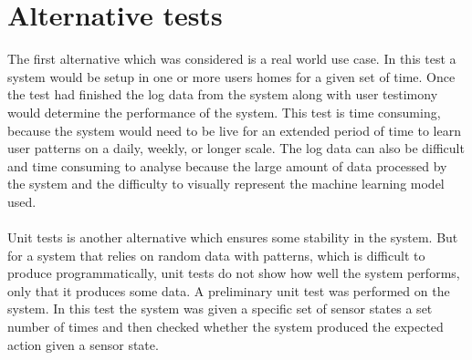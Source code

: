 \section{Alternative tests}
The first alternative which was considered is a real world use case. In this test a system would be setup in one or more users homes for a given set of time. Once the test had finished the log data from the system along with user testimony would determine the performance of the system. This test is time consuming, because the system would need to be live for an extended period of time to learn user patterns on a daily, weekly, or longer scale. The log data can also be difficult and time consuming to analyse because the large amount of data processed by the system and the difficulty to visually represent the machine learning model used.
\\\\
Unit tests is another alternative which ensures some stability in the system. But for a system that relies on random data with patterns, which is difficult to produce programmatically, unit tests do not show how well the system performs, only that it produces some data. A preliminary unit test was performed on the system. In this test the system was given a specific set of sensor states a set number of times and then checked whether the system produced the expected action given a sensor state.
